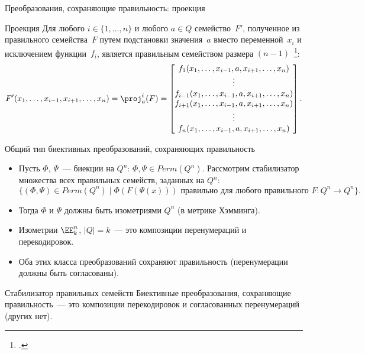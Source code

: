 \begin{frame}{Преобразования, сохраняющие правильность:  \guillemotleft проекция\guillemotright}
    \begin{exampleblock}{Проекция}
        Для любого $i \in \{1, \ldots, n\}$ и любого $a \in Q$ семейство~$F'$, полученное из правильного семейства~$F$ путем подстановки значения~$a$ вместо переменной~$x_i$ и исключением функции~$f_i$, является правильным семейством размера $(n-1)$~\footcite{nosov08}:
        \[
            F'(x_1,\ldots,x_{i-1}, x_{i+1}, \ldots, x_n) = \proj^i_a(F) =
            \begin{bmatrix}
              f_1(x_1,\ldots,x_{i-1}, a, x_{i+1}, \ldots, x_n) \\
              \vdots \\
              f_{i-1}(x_1,\ldots,x_{i-1}, a, x_{i+1}, \ldots, x_n) \\
              f_{i+1}(x_1,\ldots,x_{i-1}, a, x_{i+1}, \ldots, x_n) \\
              \vdots \\
              f_{n}(x_1,\ldots,x_{i-1}, a, x_{i+1}, \ldots, x_n) \\
            \end{bmatrix}.
        \]
    \end{exampleblock}
\end{frame}


\begin{frame}{Общий тип биективных преобразований, сохраняющих правильность}
    \begin{itemize}
        \item Пусть $\Phi$, $\Psi$~--- биекции на $Q^n$: $\Phi, \Psi \in Perm(Q^n)$.
        Рассмотрим стабилизатор множества всех правильных семейств, заданных на $Q^n$:
        \[
            \{(\Phi, \Psi) \in Perm(Q^n) \mid \Phi(F(\Psi(x))) \text{ правильно для любого правильного } F \colon Q^n \to Q^n \}.  
        \]
        \pause
        \item Тогда $\Phi$ и $\Psi$ должны быть изометриями $Q^n$ (в метрике Хэмминга).
        \pause
        \item Изометрии $\EE_k^n$, $\lvert Q \rvert = k$~--- это композиции перенумераций и перекодировок.
        \pause
        \item Оба этих класса преобразований сохраняют правильность (перенумерации должны быть согласованы).
    \end{itemize}
    \pause
    \begin{alertblock}{Стабилизатор правильных семейств}
        Биективные преобразования, сохраняющие правильность~--- это композиции перекодировок и согласованных перенумераций (других нет).
    \end{alertblock}
\end{frame}



